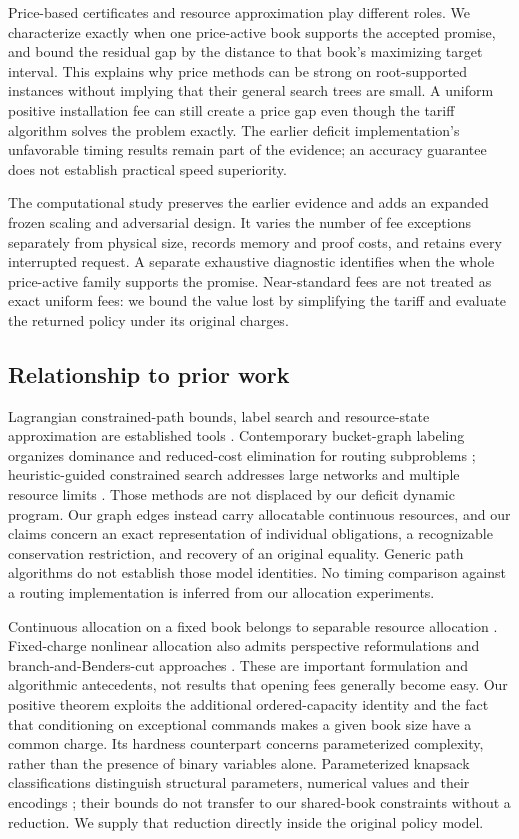 \documentclass[11pt,letterpaper]{article}
\theoremstyle{definition}\newtheorem{remark}[theorem]{Remark}
\begin{document}
Price-based certificates and resource approximation play different roles. We characterize exactly when one price-active book supports the accepted promise, and bound the residual gap by the distance to that book's maximizing target interval. This explains why price methods can be strong on root-supported instances without implying that their general search trees are small. A uniform positive installation fee can still create a price gap even though the tariff algorithm solves the problem exactly. The earlier deficit implementation's unfavorable timing results remain part of the evidence; an accuracy guarantee does not establish practical speed superiority.

The computational study preserves the earlier evidence and adds an expanded frozen scaling and adversarial design. It varies the number of fee exceptions separately from physical size, records memory and proof costs, and retains every interrupted request. A separate exhaustive diagnostic identifies when the whole price-active family supports the promise. Near-standard fees are not treated as exact uniform fees: we bound the value lost by simplifying the tariff and evaluate the returned policy under its original charges.

\subsection{Relationship to prior work}
Lagrangian constrained-path bounds, label search and resource-state approximation are established tools \citep{HandlerZang1980,BeasleyChristofides1989,Fisher1981,Hassin1992,LorenzRaz2001,PuglieseGuerriero2013}. Contemporary bucket-graph labeling organizes dominance and reduced-cost elimination for routing subproblems \citep{Sadykov2021}; heuristic-guided constrained search addresses large networks and multiple resource limits \citep{Ahmadi2025}. Those methods are not displaced by our deficit dynamic program. Our graph edges instead carry allocatable continuous resources, and our claims concern an exact representation of individual obligations, a recognizable conservation restriction, and recovery of an original equality. Generic path algorithms do not establish those model identities. No timing comparison against a routing implementation is inferred from our allocation experiments.

Continuous allocation on a fixed book belongs to separable resource allocation \citep{Patriksson2008}. Fixed-charge nonlinear allocation also admits perspective reformulations and branch-and-Benders-cut approaches \citep{Yang2025}. These are important formulation and algorithmic antecedents, not results that opening fees generally become easy. Our positive theorem exploits the additional ordered-capacity identity and the fact that conditioning on exceptional commands makes a given book size have a common charge. Its hardness counterpart concerns parameterized complexity, rather than the presence of binary variables alone. Parameterized knapsack classifications distinguish structural parameters, numerical values and their encodings \citep{Gurski2019}; their bounds do not transfer to our shared-book constraints without a reduction. We supply that reduction directly inside the original policy model.
\end{document}
